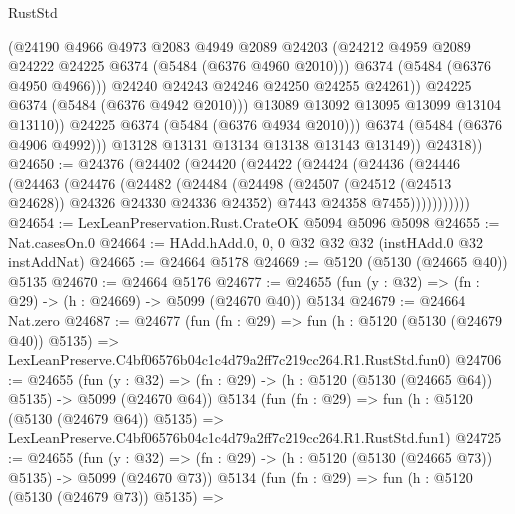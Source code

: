 \begin{lexlean}{RustStd}
\begin{coremodule}
                          (@24190
                            @4966
                            @4973
                            @2083
                            @4949
                            @2089
                            @24203
                            (@24212 @4959 @2089 @24222 @24225 @6374 (@5484 (@6376 @4960 @2010)))
                            @6374
                            (@5484 (@6376 @4950 @4966)))
                          @24240
                          @24243
                          @24246
                          @24250
                          @24255
                          @24261))
                      @24225
                      @6374
                      (@5484 (@6376 @4942 @2010)))
                    @13089
                    @13092
                    @13095
                    @13099
                    @13104
                    @13110))
                @24225
                @6374
                (@5484 (@6376 @4934 @2010)))
              @6374
              (@5484 (@6376 @4906 @4992)))
            @13128
            @13131
            @13134
            @13138
            @13143
            @13149))
        @24318))
@24650 := @24376
    (@24402
      (@24420
        (@24422
          (@24424
            (@24436
              (@24446
                (@24463
                  (@24476
                    (@24482
                      (@24484
                        (@24498
                          (@24507 (@24512 (@24513 @24628)) @24326 @24330 @24336 @24352)
                          @7443
                          @24358
                          @7455)))))))))))
@24654 := LexLeanPreservation.Rust.CrateOK @5094 @5096 @5098
@24655 := Nat.casesOn.{0}
@24664 := HAdd.hAdd.{0, 0, 0} @32 @32 @32 (instHAdd.{0} @32 instAddNat)
@24665 := @24664 @5178
@24669 := @5120 (@5130 (@24665 @40)) @5135
@24670 := @24664 @5176
@24677 := @24655 (fun (y : @32) => (fn : @29) -> (h : @24669) -> @5099 (@24670 @40)) @5134
@24679 := @24664 Nat.zero
@24687 := @24677
    (fun (fn : @29) =>
    fun (h : @5120 (@5130 (@24679 @40)) @5135) =>
    LexLeanPreserve.C4bf06576b04c1c4d79a2ff7c219cc264.R1.RustStd.fun0)
@24706 := @24655
    (fun (y : @32) => (fn : @29) -> (h : @5120 (@5130 (@24665 @64)) @5135) -> @5099 (@24670 @64))
    @5134
    (fun (fn : @29) =>
    fun (h : @5120 (@5130 (@24679 @64)) @5135) =>
    LexLeanPreserve.C4bf06576b04c1c4d79a2ff7c219cc264.R1.RustStd.fun1)
@24725 := @24655
    (fun (y : @32) => (fn : @29) -> (h : @5120 (@5130 (@24665 @73)) @5135) -> @5099 (@24670 @73))
    @5134
    (fun (fn : @29) =>
    fun (h : @5120 (@5130 (@24679 @73)) @5135) =>

\end{coremodule}
\end{lexlean}

